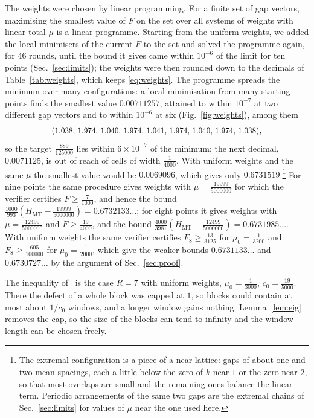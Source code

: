 \documentclass[aps,prd,twocolumn,superscriptaddress,nofootinbib,longbibliography,floatfix,showkeys,amsmath,amssymb,10pt]{revtex4-2}
\theoremstyle{definition}
\theoremstyle{remark}
\newcommand{\MT}{\mathrm{MT}}
\begin{document}
The weights were chosen by linear programming. For a finite set of gap
vectors, maximising the smallest value of $F$ on the set over all systems
of weights with linear total $\mu$ is a linear programme. Starting from the
uniform weights, we added the local minimisers of the current $F$ to the
set and solved the programme again, for 46 rounds, until the bound it gives
came within $10^{-6}$ of the limit for ten points (Sec.~\ref{sec:limits});
the weights were
then rounded down to the decimals of Table~\ref{tab:weights}, which keeps
\eqref{eq:weights}. The programme spreads the minimum over many
configurations: a local minimisation from many starting points finds the
smallest value $0.00711257$, attained to within $10^{-7}$ at two different
gap vectors and to within $10^{-6}$ at six (Fig.~\ref{fig:weights}),
among them
\[
 \scalebox{0.94}{$(1.038,\,1.974,\,1.040,\,1.974,\,1.041,\,1.974,\,1.040,\,1.974,\,1.038)$},
\]
so the target $\frac{889}{125000}$ lies within $6\times10^{-7}$ of the
minimum; the next decimal, $0.0071125$, is out of reach of cells of width
$\frac1{4000}$. With uniform weights and the same $\mu$ the
smallest value would be $0.0069096$, which gives only $0.6731519$.\footnote{The extremal configuration is a
piece of a near-lattice: gaps of about one and two mean spacings, each
a little below the zero of $k$ near $1$ or the zero near $2$, so
that most overlaps are small and the remaining ones balance the linear term.
Periodic arrangements of the same two gaps are the extremal chains of
Sec.~\ref{sec:limits} for values of $\mu$ near the one used here.} For
nine points the same procedure gives weights with
$\mu=\frac{19999}{5000000}$ for which the verifier certifies
$F\ge\frac7{1000}$, and hence the bound
$\frac{1000}{993}(H_\MT-\frac{19999}{5000000})=0.6732133\ldots$; for eight
points it gives weights with $\mu=\frac{12499}{5000000}$ and
$F\ge\frac{19}{4000}$, and the bound
$\frac{4000}{3981}(H_\MT-\frac{12499}{5000000})=0.6731985\ldots$. With
uniform weights the same verifier certifies $F_8\ge\frac{13}{3125}$ for
$\mu_0=\frac1{3200}$ and $F_8\ge\frac{605}{100000}$ for
$\mu_0=\frac1{2000}$, which give the weaker bounds $0.6731133\ldots$ and
$0.6730727\ldots$ by the argument of Sec.~\ref{sec:proof}.

The inequality of~\cite{Ain26} is the case $R=7$ with uniform weights,
$\mu_0=\frac1{3000}$,
$c_0=\frac{19}{5000}$. There the defect of a whole block was capped at $1$,
so blocks could contain at most about $1/c_0$ windows, and a longer window
gains nothing. Lemma~\ref{lem:eig} removes the cap, so the size of the
blocks can tend to infinity and the window length can be chosen freely.
\end{document}
